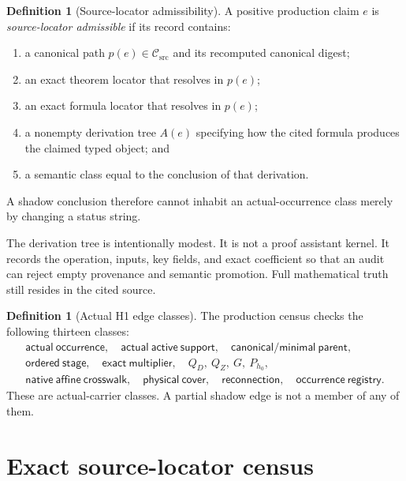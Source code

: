 \documentclass[11pt]{article}
\theoremstyle{definition}
\newtheorem{definition}[theorem]{Definition}
\theoremstyle{remark}
\newcommand{\Csrc}{\mathcal C_{\mathrm{src}}}
\begin{document}
\begin{definition}[Source-locator admissibility]\label{def:admissible}
A positive production claim \(e\) is \emph{source-locator admissible}
if its record contains:
\begin{enumerate}[label=(\roman*),leftmargin=2.1em]
 \item a canonical path \(p(e)\in\Csrc\) and its recomputed canonical
       digest;
 \item an exact theorem locator that resolves in \(p(e)\);
 \item an exact formula locator that resolves in \(p(e)\);
 \item a nonempty derivation tree \(A(e)\) specifying how the cited
       formula produces the claimed typed object; and
 \item a semantic class equal to the conclusion of that derivation.
\end{enumerate}
A shadow conclusion therefore cannot inhabit an actual-occurrence
class merely by changing a status string.
\end{definition}

The derivation tree is intentionally modest.  It is not a proof
assistant kernel.  It records the operation, inputs, key fields, and
exact coefficient so that an audit can reject empty provenance and
semantic promotion.  Full mathematical truth still resides in the
cited source.

\begin{definition}[Actual H1 edge classes]\label{def:classes}
The production census checks the following thirteen classes:
\[
\begin{gathered}
\mathsf{actual\ occurrence},\quad
\mathsf{actual\ active\ support},\quad
\mathsf{canonical/minimal\ parent},\\
\mathsf{ordered\ stage},\quad
\mathsf{exact\ multiplier},\quad
Q_D,\ Q_Z,\ G,\ P_{h_0},\\
\mathsf{native\ affine\ crosswalk},\quad
\mathsf{physical\ cover},\quad
\mathsf{reconnection},\quad
\mathsf{occurrence\ registry}.
\end{gathered}
\]
These are actual-carrier classes.  A partial shadow edge is not a
member of any of them.
\end{definition}

\section{Exact source-locator census}
\end{document}

